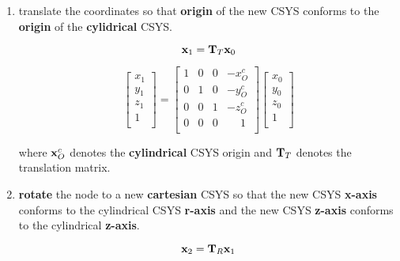  \begin{enumerate}
     \item translate the coordinates so that \textbf{origin} of the new
         CSYS conforms to the \textbf{origin} of the \textbf{cylidrical}
         CSYS.

         \begin{equation}
             \mathbf{x}_1 = \mathbf{T}_T \mathbf{x}_0
         \end{equation}

         \begin{equation}
             \begin{bmatrix}
                 x_1 \\
                 y_1 \\
                 z_1 \\
                 1 \\
             \end{bmatrix}
             = \begin{bmatrix}
                 1 & 0 & 0 & -x_O^c \\
                 0 & 1 & 0 & -y_O^c \\
                 0 & 0 & 1 & -z_O^c \\
                 0 & 0 & 0 & \phantom{-}1 \\
             \end{bmatrix}
             \begin{bmatrix}
                 x_0 \\
                 y_0 \\
                 z_0 \\
                 1 \\
             \end{bmatrix}
         \end{equation}

         where $ \mathbf{x}_O^c $ denotes the \textbf{cylindrical} CSYS origin
         and $ \mathbf{T}_T $ denotes the translation matrix.

    \item \textbf{rotate} the node to a new \textbf{cartesian} CSYS so that
        the new CSYS \textbf{x-axis} conforms to the cylindrical CSYS
        \textbf{r-axis} and the new CSYS \textbf{z-axis} conforms to the
        cylindrical \textbf{z-axis}.

        \begin{equation}
            \mathbf{x}_2 = \mathbf{T}_R \mathbf{x}_1
        \end{equation}


\end{enumerate}
